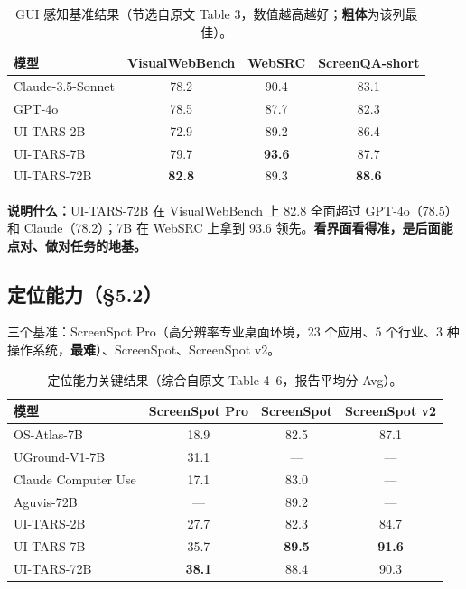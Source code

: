 \documentclass[11pt,UTF8,fontset=fandol]{ctexart}
\begin{document}
\begin{table}[H]\centering
\caption{GUI 感知基准结果（节选自原文 Table 3，数值越高越好；\textbf{粗体}为该列最佳）。}
\label{tab:perc}
\small
\begin{tabular}{lccc}
\toprule
模型 & VisualWebBench & WebSRC & ScreenQA-short \\
\midrule
Claude-3.5-Sonnet & 78.2 & 90.4 & 83.1 \\
GPT-4o            & 78.5 & 87.7 & 82.3 \\
UI-TARS-2B        & 72.9 & 89.2 & 86.4 \\
UI-TARS-7B        & 79.7 & \textbf{93.6} & 87.7 \\
UI-TARS-72B       & \textbf{82.8} & 89.3 & \textbf{88.6} \\
\bottomrule
\end{tabular}
\end{table}

\textbf{说明什么：}UI-TARS-72B 在 VisualWebBench 上 82.8 全面超过 GPT-4o（78.5）和 Claude（78.2）；7B 在 WebSRC 上拿到 93.6 领先。\textbf{看界面看得准，是后面能点对、做对任务的地基。}

\subsection{定位能力（§5.2）}

三个基准：ScreenSpot Pro（高分辨率专业桌面环境，23 个应用、5 个行业、3 种操作系统，\textbf{最难}）、ScreenSpot、ScreenSpot v2。

\begin{table}[H]\centering
\caption{定位能力关键结果（综合自原文 Table 4--6，报告平均分 Avg）。}
\label{tab:ground}
\small
\begin{tabular}{lccc}
\toprule
模型 & ScreenSpot Pro & ScreenSpot & ScreenSpot v2 \\
\midrule
OS-Atlas-7B        & 18.9 & 82.5 & 87.1 \\
UGround-V1-7B      & 31.1 & ---  & ---  \\
Claude Computer Use& 17.1 & 83.0 & ---  \\
Aguvis-72B         & ---  & 89.2 & ---  \\
UI-TARS-2B         & 27.7 & 82.3 & 84.7 \\
UI-TARS-7B         & 35.7 & \textbf{89.5} & \textbf{91.6} \\
UI-TARS-72B        & \textbf{38.1} & 88.4 & 90.3 \\
\bottomrule
\end{tabular}
\end{table}
\end{document}
